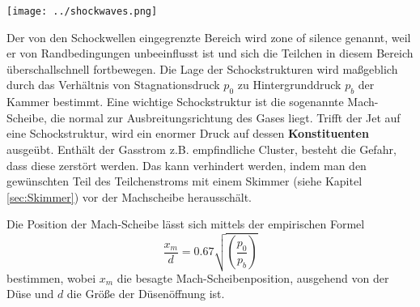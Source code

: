 %
\begin{center}
\begin{minipage}{\linewidth}
\centering
\texttt{[image: ../shockwaves.png]}%
 \label{fig:Schockwellen}
\end{minipage} 
\end{center} 
% 
Der von den Schockwellen eingegrenzte Bereich wird zone of silence genannt, weil er von Randbedingungen unbeeinflusst ist und sich die Teilchen in diesem Bereich überschallschnell fortbewegen.
Die Lage der Schockstrukturen wird maßgeblich durch das Verhältnis von Stagnationsdruck $p_0$ zu Hintergrunddruck $p_b$ der Kammer bestimmt. Eine wichtige Schockstruktur ist die sogenannte Mach-Scheibe, die normal zur Ausbreitungsrichtung des Gases liegt. Trifft der Jet auf eine Schockstruktur, wird ein enormer Druck auf dessen \textbf{Konstituenten} ausgeübt. Enthält der Gasstrom z.B. empfindliche Cluster, besteht die Gefahr, dass diese zerstört werden. Das kann verhindert werden, indem man den gewünschten Teil des Teilchenstroms mit einem Skimmer (siehe Kapitel \ref{sec:Skimmer}) vor der Machscheibe herausschält.

Die Position der Mach-Scheibe lässt sich mittels der empirischen Formel
\begin{equation} \label{eq:Machscheibe}
\frac{x_m}{d}=0.67 \sqrt{\left( \frac{p_0}{p_b}\right)}
\end{equation}
%
bestimmen, wobei $x_m$ die besagte Mach-Scheibenposition, ausgehend von der Düse und $d$ die Größe der Düsenöffnung ist.



